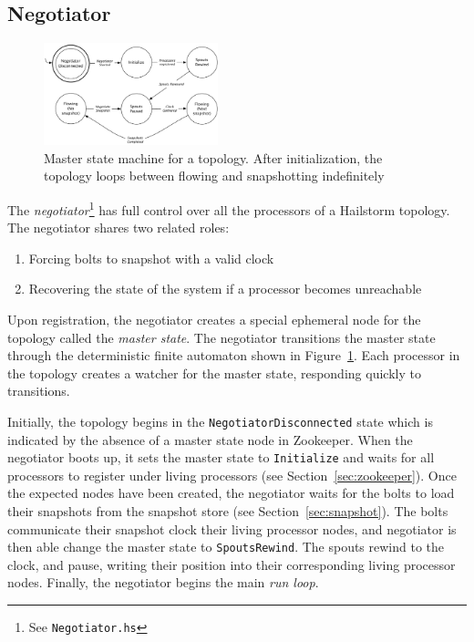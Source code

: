 \documentclass[10pt,nocopyrightspace]{sigplanconf}
\begin{document}
\subsection{Negotiator}
\label{sec:negotiator}
\begin{figure}
  \includegraphics[width=0.45\textwidth]{images/master_state.pdf}
  \caption{Master state machine for a topology. After initialization, the
  topology loops between flowing and snapshotting indefinitely}
  \label{fig:masterstate}
\end{figure}

The \textit{negotiator}\footnote{See \texttt{Negotiator.hs}} has full control 
over all the processors of a Hailstorm topology. The negotiator shares 
two related roles:
\begin{enumerate}
  \item Forcing bolts to snapshot with a valid clock
  \item Recovering the state of the system if a processor 
        becomes unreachable
\end{enumerate}

Upon registration, the negotiator creates a special ephemeral node for the
topology called the \textit{master state}. The negotiator transitions the master
state through the deterministic finite automaton shown in
Figure~\ref{fig:masterstate}. Each processor in the topology creates a
watcher for the master state, responding quickly to transitions.

Initially, the topology begins in the \texttt{NegotiatorDisconnected} state which
is indicated by the absence of a master state node in Zookeeper. When the
negotiator boots up, it sets the master state to \texttt{Initialize} and waits
for all processors to register under living processors (see
Section~\ref{sec:zookeeper}). Once the expected nodes have been created, the
negotiator waits for the bolts to load their snapshots from the snapshot store
(see Section~\ref{sec:snapshot}). The bolts communicate their snapshot clock 
their living processor nodes, and negotiator is then able change the master state to 
\texttt{SpoutsRewind}. The spouts rewind to the clock, and pause, writing their
position into their corresponding living processor nodes. Finally, the
negotiator begins the main \textit{run loop}.
\end{document}
